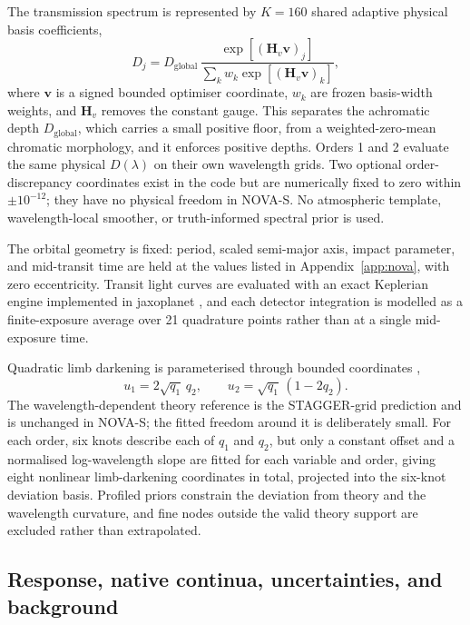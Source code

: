The transmission spectrum is represented by $K=160$ shared adaptive physical
basis coefficients,
\begin{equation}
  D_j = D_{\mathrm{global}}\,
  \frac{\exp\!\left[(\bm{H}_v\bm{v})_j\right]}
       {\sum_k w_k \exp\!\left[(\bm{H}_v\bm{v})_k\right]} ,
  \label{eq:depth-basis}
\end{equation}
where $\bm{v}$ is a signed bounded optimiser coordinate, $w_k$ are frozen
basis-width weights, and $\bm{H}_v$ removes the constant gauge. This
separates the achromatic depth $D_{\mathrm{global}}$, which carries a small
positive floor, from a weighted-zero-mean chromatic morphology, and it
enforces positive depths. Orders 1 and 2 evaluate the same physical
$D(\lambda)$ on their own wavelength grids. Two optional order-discrepancy
coordinates exist in the code but are numerically fixed to zero within
$\pm 10^{-12}$; they have no physical freedom in NOVA-S. No atmospheric
template, wavelength-local smoother, or truth-informed spectral prior is
used.

The orbital geometry is fixed: period, scaled semi-major axis, impact
parameter, and mid-transit time are held at the values listed in
Appendix~\ref{app:nova}, with zero eccentricity. Transit light curves are
evaluated with an exact Keplerian engine implemented in jaxoplanet
\citep{Jaxoplanet2024}, and each detector integration is modelled as a
finite-exposure average over 21 quadrature points rather than at a single
mid-exposure time.

Quadratic limb darkening \citep{MandelAgol2002} is parameterised through
bounded coordinates \citep{Kipping2013},
\begin{equation}
 u_1=2\sqrt{q_1}\,q_2, \qquad
 u_2=\sqrt{q_1}\,(1-2q_2).
 \label{eq:kipping-coordinates}
\end{equation}
The wavelength-dependent theory reference is the STAGGER-grid prediction
\citep{MagicEtAl2015} and is unchanged in NOVA-S; the fitted freedom around
it is deliberately small. For each order, six knots describe each of $q_1$
and $q_2$, but only a constant offset and a normalised log-wavelength slope
are fitted for each variable and order, giving eight nonlinear
limb-darkening coordinates in total, projected into the six-knot deviation
basis. Profiled priors constrain the deviation from theory and the
wavelength curvature, and fine nodes outside the valid theory support are
excluded rather than extrapolated.

\subsection{Response, native continua, uncertainties, and background}

